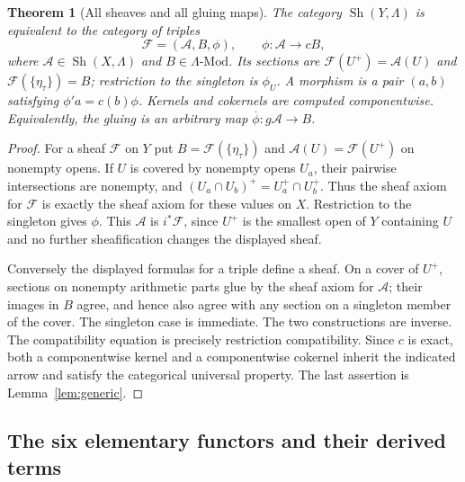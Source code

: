 \documentclass[11pt,a4paper]{article}
\newtheorem{theorem}{Theorem}[section]
\theoremstyle{definition}\newtheorem{definition}[theorem]{Definition}
\providecommand{\Sh}{\operatorname{Sh}}
\begin{document}
\begin{theorem}[All sheaves and all gluing maps]\label{thm:triples}
The category $\Sh(Y,\Lambda)$ is equivalent to the category of triples
\[
 \mathcal F=(\mathcal A,B,\phi),\qquad
 \phi:\mathcal A\longrightarrow cB,
 \tag{RP3}\label{eq:triples}
\]
where $\mathcal A\in\Sh(X,\Lambda)$ and $B\in\Lambda\text{-}\mathrm{Mod}$.
Its sections are $\mathcal F(U^+)=\mathcal A(U)$ and
$\mathcal F(\{\eta_\tau\})=B$; restriction to the singleton is
$\phi_U$. A morphism is a pair $(a,b)$ satisfying
$\phi'a=c(b)\phi$. Kernels and cokernels are computed componentwise.
Equivalently, the gluing is an arbitrary map
$\overline\phi:g\mathcal A\to B$.
\end{theorem}
\begin{proof}
For a sheaf $\mathcal F$ on $Y$ put $B=\mathcal F(\{\eta_\tau\})$ and
$\mathcal A(U)=\mathcal F(U^+)$ on nonempty opens. If $U$ is covered
by nonempty opens $U_a$, their pairwise intersections are nonempty,
and $(U_a\cap U_b)^+=U_a^+\cap U_b^+$. Thus the sheaf axiom for
$\mathcal F$ is exactly the sheaf axiom for these values on $X$.
Restriction to the singleton gives $\phi$. This $\mathcal A$ is
$i^*\mathcal F$, since $U^+$ is the smallest open of $Y$ containing $U$
and no further sheafification changes the displayed sheaf.

Conversely the displayed formulas for a triple define a sheaf.
On a cover of $U^+$, sections on nonempty arithmetic parts glue by the
sheaf axiom for $\mathcal A$; their images in $B$ agree, and hence
also agree with any section on a singleton member of the cover.
The singleton case is immediate. The two constructions are inverse.
The compatibility equation is precisely restriction compatibility.
Since $c$ is exact, both a componentwise kernel and a componentwise
cokernel inherit the indicated arrow and satisfy the categorical
universal property. The last assertion is Lemma~\ref{lem:generic}.
\end{proof}

\subsection{The six elementary functors and their derived terms}
\end{document}

